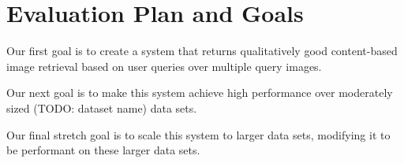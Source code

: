 \section{Evaluation Plan and Goals}

Our first goal is to create a system that returns qualitatively good content-based image retrieval based on user queries over multiple query images.

Our next goal is to make this system achieve high performance over moderately sized (TODO: dataset name) data sets.

Our final stretch goal is to scale this system to larger data sets, modifying it to be performant on these larger data sets.
